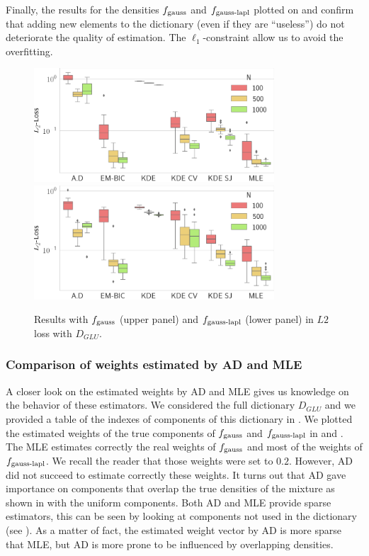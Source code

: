 Finally, the results for the densities $f_{\textnormal{gauss}}$ and $f_{\textnormal{gauss-lapl}}$
plotted on  and  confirm that
adding new elements to the dictionary (even if they are ``useless'') do not deteriorate
the quality of estimation. The $\ell_1$-constraint allow us to avoid the overfitting. 
\begin{figure}
\center
    \includegraphics[width=0.8\textwidth]{./TeX_files/res_gauss_L2_GLU.png}
    \includegraphics[width=0.8\textwidth]{./TeX_files/res_lapl_gauss_L2_GLU.png}
    \caption{Results with $f_{\textnormal{gauss}}$ (upper panel) and $f_{\textnormal{gauss-lapl}}$ 
    (lower panel) in $L2$ loss with $D_{GLU}$.}
    \label{fig:res_ext_L2_GLU}
\end{figure}

\subsubsection{Comparison of weights estimated by AD and MLE}

A closer look on the estimated weights by AD and MLE gives us knowledge on the behavior of these estimators. We considered the full dictionary $D_{GLU}$ and we provided a table of the indexes of components of this dictionary in . We plotted the estimated weights of the true components of $f_{\textnormal{gauss}}$ and $f_{\textnormal{gauss-lapl}}$ in  and . The MLE estimates correctly the real weights of $f_{\textnormal{gauss}}$ and most of the weights of $f_{\textnormal{gauss-lapl}}$. We recall the reader that those weights were set to $0.2$. However, AD did not succeed to estimate correctly these weights. It turns out that AD gave importance on components that overlap the true densities of the mixture as shown in  with the uniform components. Both AD and MLE provide sparse estimators, this can be seen by looking at components not used in the dictionary (see ). As a matter of fact, the estimated weight vector by AD is more sparse that MLE, but AD is more prone to be influenced by overlapping densities.

